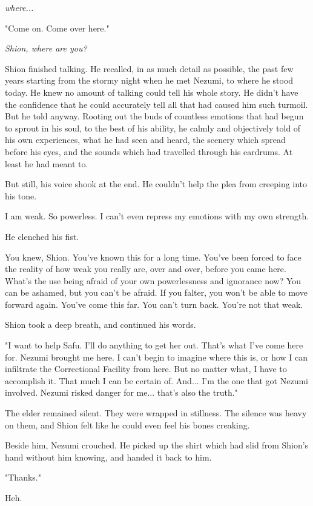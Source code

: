 \emph{where...}

"Come on. Come over here."

\emph{Shion, where are you?}

Shion finished talking. He recalled, in as much detail as possible, the
past few years starting from the stormy night when he met Nezumi, to
where he stood today. He knew no amount of talking could tell his whole
story. He didn't have the confidence that he could accurately tell all
that had caused him such turmoil. But he told anyway. Rooting out the
buds of countless emotions that had begun to sprout in his soul, to the
best of his ability, he calmly and objectively told of his own
experiences, what he had seen and heard, the scenery which spread before
his eyes, and the sounds which had travelled through his eardrums. At
least he had meant to.

But still, his voice shook at the end. He couldn't help the plea from
creeping into his tone.

I am weak. So powerless. I can't even repress my emotions with my own
strength.

He clenched his fist.

You knew, Shion. You've known this for a long time. You've been forced
to face the reality of how weak you really are, over and over, before
you came here. What's the use being afraid of your own powerlessness and
ignorance now? You can be ashamed, but you can't be afraid. If you
falter, you won't be able to move forward again. You've come this far.
You can't turn back. You're not that weak.

Shion took a deep breath, and continued his words.

"I want to help Safu. I'll do anything to get her out. That's what I've
come here for. Nezumi brought me here. I can't begin to imagine where
this is, or how I can infiltrate the Correctional Facility from here.
But no matter what, I have to accomplish it. That much I can be certain
of. And... I'm the one that got Nezumi involved. Nezumi risked danger
for me... that's also the truth."

The elder remained silent. They were wrapped in stillness. The silence
was heavy on them, and Shion felt like he could even feel his bones
creaking.

Beside him, Nezumi crouched. He picked up the shirt which had slid from
Shion's hand without him knowing, and handed it back to him.

"Thanks."

Heh.

